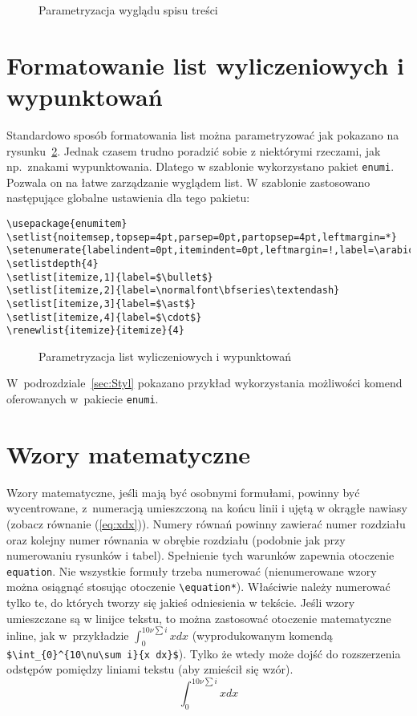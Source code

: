 \begin{figure}[h]
\drawtoc
\caption{Parametryzacja wyglądu spisu treści} \label{fig:ltoc}
\end{figure}


\section{Formatowanie list wyliczeniowych i wypunktowań}
Standardowo sposób formatowania list można parametryzować jak pokazano na rysunku~\ref{fig:listlay}. Jednak czasem trudno poradzić sobie z niektórymi rzeczami, jak np.~znakami wypunktowania. Dlatego w szablonie wykorzystano pakiet \texttt{enumi}. Pozwala on na łatwe zarządzanie wyglądem list. W szablonie zastosowano następujące globalne ustawienia dla tego pakietu:
\begin{lstlisting}[basicstyle=\footnotesize\ttfamily]
\usepackage{enumitem} 
\setlist{noitemsep,topsep=4pt,parsep=0pt,partopsep=4pt,leftmargin=*} 
\setenumerate{labelindent=0pt,itemindent=0pt,leftmargin=!,label=\arabic*.} 
\setlistdepth{4} 
\setlist[itemize,1]{label=$\bullet$} 
\setlist[itemize,2]{label=\normalfont\bfseries\textendash}
\setlist[itemize,3]{label=$\ast$}
\setlist[itemize,4]{label=$\cdot$}
\renewlist{itemize}{itemize}{4}
\end{lstlisting}
\begin{figure}[h]
\centering
{}
\drawparameterstrue
\drawlist
\caption{Parametryzacja list wyliczeniowych i wypunktowań}\label{fig:listlay}
\end{figure}

W~podrozdziale~\ref{sec:Styl} pokazano przykład wykorzystania możliwości komend oferowanych w~pakiecie \texttt{enumi}.

\section{Wzory matematyczne}
Wzory matematyczne, jeśli mają być osobnymi formułami, powinny być wycentrowane, z~numeracją umieszczoną na końcu linii i ujętą w okrągłe nawiasy (zobacz równanie (\ref{eq:xdx})). Numery równań powinny zawierać numer rozdziału oraz kolejny numer równania w obrębie rozdziału (podobnie jak przy numerowaniu rysunków i tabel). Spełnienie tych warunków zapewnia otoczenie \verb?equation?. Nie wszystkie formuły trzeba numerować (nienumerowane wzory można osiągnąć stosując otoczenie \verb?\equation*?). Właściwie należy numerować tylko te, do których tworzy się jakieś odniesienia w tekście. Jeśli wzory umieszczane są w linijce tekstu, to można zastosować otoczenie matematyczne inline, jak w~przykładzie $\int_{0}^{10\nu\sum i}{x dx}$ (wyprodukowanym komendą \verb?$\int_{0}^{10\nu\sum i}{x dx}$?). Tylko że wtedy może dojść do rozszerzenia odstępów pomiędzy liniami tekstu (aby zmieścił się wzór).
\begin{equation}\label{eq:xdx}
\int_{0}^{10\nu\sum i}{x dx}
\end{equation}